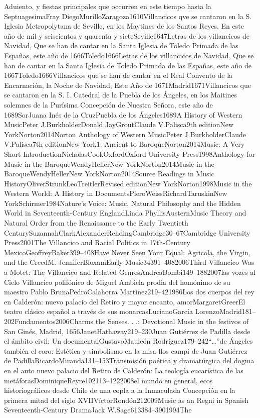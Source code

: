 \documentclass{memoir}
\begin{document}
{{{{{{{{Aduiento, y fiestas principales que occurren en este tiempo hasta la SeptuagesimaFray DiegoMurilloZaragoza1610Villancicos qve se cantaron en la S. Iglesia Metropolytana de Seville, en los Maytines de los Santos Reyes. En este año de mil y seiscientos y quarenta y sieteSeville1647Letras de los villancicos de Navidad, Que se han de cantar en la Santa Iglesia de Toledo Primada de las Españas, este año de 1666Toledo1666Letras de los villancicos de Navidad, Que se han de cantar en la Santa Iglesia de Toledo Primada de las Españas, este año de 1667Toledo1666Villancicos que se han de cantar en el Real Convento de la Encarnación, la Noche de Navidad, Este Año de 1671Madrid1671Villancicos que se cantaron en la S. I. Catedral de la Puebla de los Ángeles, en los Maitines solemnes de la Purísima Concepción de Nuestra Señora, este año de 1689SorJuana Inés de la CruzPuebla de los Ángeles1689A History of Western MusicPeter J.BurkholderDonald JayGroutClaude V.Palisca9th editionNew YorkNorton2014Norton Anthology of Western MusicPeter J.BurkholderClaude V.Palisca7th editionNew York1: Ancient to BaroqueNorton2014Music: A Very Short IntroductionNicholasCookOxfordOxford University Press1998Anthology for Music in the BaroqueWendyHellerNew YorkNorton2014Music in the BaroqueWendyHellerNew YorkNorton2014Source Readings in Music HistoryOliverStrunkLeoTreitlerRevised editionNew YorkNorton1998Music in the Western World: A History in DocumentsPieroWeissRichardTaruskinNew YorkSchirmer1984\mkbibquoteTis Nature's Voice: Music, Natural Philosophy and the Hidden World in Seventeenth-Century EnglandLinda PhyllisAusternMusic Theory and Natural Order from the Renaissance to the Early Twentieth CenturySuzannahClarkAlexanderRehdingCambridge30–67Cambridge University Press2001The \mkbibquoteEthnic Villancico and Racial Politics in 17th-Century MexicoGeoffreyBaker399–408\mkbibquoteI Have Never Seen Your Equal: Agricola, the Virgin, and the CreedM. JenniferBloxamEarly Music34391–4082006\mkbibquoteThe Third Villancico Was a Motet: The Villancico and Related GenresAndreaBombi149–1882007\mkbibquoteSuban las vozes al Cielo Villancico polifónico de Miguel Ambiela prodia del homónimo de su maestro Pablo BrunaPedroCalahorra Martínez219–421986Los dos cuerpos del rey en Calderón: \mkbibemphEl nuevo palacio del Retiro y \mkbibemphEl mayor encanto, amorMargaretGreerEl teatro clásico español a través de sus monarcasLucianoGarcía LorenzoMadrid181–202Fundamentos2006\mkbibquoteMusic Charms the Senses. . .: Devotional Music in the \mkbibemphTriunfos festivos of San Ginés, Madrid, 1656JanetHathaway219–230Juan Gutiérrez de Padilla desde el ámbito civil: Un \mkbibemphcorpus documentalGustavoMauleón Rodríguez179–242\mkbibquote\dots de Ángeles también el coro: Estética y simbolismo en la misa \mkbibemphEgo flos campi de Juan Gutiérrez de PadillaRicardoMiranda131–153Transmisión poética y dramatúrgica del dogma en el auto \mkbibemphEl nuevo palacio del Retiro de Calderón: La teología eucarística de las metáforasDominiqueReyre102113–1222008\mkbibemphTodo el mundo en general, ecos historiográficos desde Chile de una copla a la Inmaculada Concepción en la primera mitad del siglo XVIIVíctorRondón212009Music as an \mkbibquoteInstrumentum Regni in Spanish Seventeenth-Century DramaJack W.Sage613384–3901994The \mkbibquoteDistinguished }}}}}}}}
\end{document}
